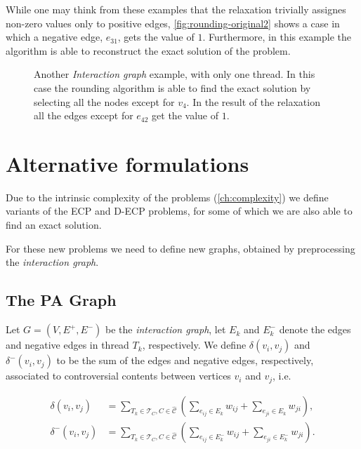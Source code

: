 While one may think from these examples that the relaxation trivially assignes
non-zero values only to positive edges, \autoref{fig:rounding-original2} shows
a case in which a negative edge, $e_{31}$, gets the value of $1$. Furthermore,
in this example the algorithm is able to reconstruct the exact solution of the problem.

\begin{figure}
	\centering
	\caption[Example of rounding algorithm finding the exact solution]{Another
		\emph{Interaction graph} example, with only one thread. In
		this case the rounding algorithm is able to find the exact solution by
		selecting all the nodes except for $v_4$. In the result of the
		relaxation all the edges except for $e_{42}$ get the value of $1$.}%
	\label{fig:rounding-original2}
\end{figure}

\section{Alternative formulations}%
\label{sec:alternative-formulations}

Due to the intrinsic complexity of the problems
(\autoref{ch:complexity}) we define variants of
the \acrshort{ECP} and \acrshort{D-ECP} problems, for some of which we are also able to find an exact solution.

For these new problems we need to define new graphs, obtained by preprocessing
the \emph{interaction graph}.

\subsection{The \acrlong{PA} Graph}%
\label{sub:pa-graph}

Let $G = (V, E^{+}, E^{-})$ be the \emph{interaction graph}, let $E_k$ and
$E^-_k$ denote the edges and negative edges in thread $T_k$,
respectively. We define $\delta(v_{i}, v_{j})$ and
$\delta^{-} (v_{i}, v_{j})$ to be the sum of the edges and negative edges, respectively,
associated to controversial contents between vertices $v_{i} $ and $v_{j}
$, i.e.\

\begin{align}
	\label{eq:}
	\delta(v_{i}, v_{j})   & = \sum^{}_{T_k \in \mathcal{T}_C, C \in
	\mathcal{\hat{C}} } ( \sum^{}_{e_{ij} \in E_k} w_{ij} + \sum^{}_{e_{ji} \in
	E_k} w_{ji} ),
	\\
	\delta^-(v_{i}, v_{j}) & = \sum^{}_{T_k \in \mathcal{T}_C, C \in
	\mathcal{\hat{C}} } ( \sum^{}_{e_{ij} \in E^-_k} w_{ij} + \sum^{}_{e_{ji} \in
	E^-_k} w_{ji} ).
\end{align}

